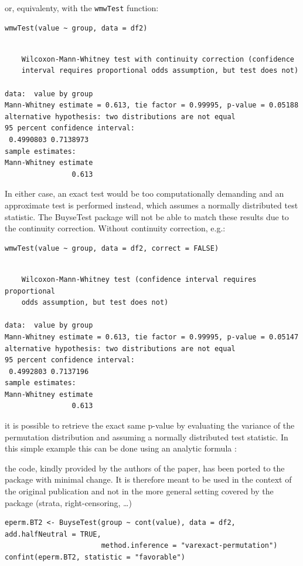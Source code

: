 \documentclass[12pt]{article}
\newcommand\Warning[1][3ex]{%
\renewcommand\stacktype{L}%
\scaleto{\stackon[1.3pt]{\color{red}$\triangle$}{\tiny\bfseries !}}{#1}%
\xspace
}
\begin{document}
or, equivalenty, with the \texttt{wmwTest} function:
\lstset{language=r,label= ,caption= ,captionpos=b,numbers=none}
\begin{lstlisting}
wmwTest(value ~ group, data = df2)
\end{lstlisting}

\begin{verbatim}

	Wilcoxon-Mann-Whitney test with continuity correction (confidence
	interval requires proportional odds assumption, but test does not)

data:  value by group
Mann-Whitney estimate = 0.613, tie factor = 0.99995, p-value = 0.05188
alternative hypothesis: two distributions are not equal
95 percent confidence interval:
 0.4990803 0.7138973
sample estimates:
Mann-Whitney estimate 
                0.613
\end{verbatim}

In either case, an exact test would be too computationally demanding
and an approximate test is performed instead, which assumes a normally
distributed test statistic. The BuyseTest package will not be able to
match these results due to the continuity correction. Without
continuity correction, e.g.:
\lstset{language=r,label= ,caption= ,captionpos=b,numbers=none}
\begin{lstlisting}
wmwTest(value ~ group, data = df2, correct = FALSE)
\end{lstlisting}

\begin{verbatim}

	Wilcoxon-Mann-Whitney test (confidence interval requires proportional
	odds assumption, but test does not)

data:  value by group
Mann-Whitney estimate = 0.613, tie factor = 0.99995, p-value = 0.05147
alternative hypothesis: two distributions are not equal
95 percent confidence interval:
 0.4992803 0.7137196
sample estimates:
Mann-Whitney estimate 
                0.613
\end{verbatim}

\noindent it is possible to retrieve the exact same p-value by
evaluating the variance of the permutation distribution and assuming a
normally distributed test statistic. In this simple example this can
be done using an analytic formula \citep{anderson2023exact}: \newline
\Warning the code, kindly provided by the authors of the paper, has
been ported to the package with minimal change. It is therefore meant
to be used in the context of the original publication and not in the
more general setting covered by the package (strata, right-censoring,
\ldots)
\lstset{language=r,label= ,caption= ,captionpos=b,numbers=none}
\begin{lstlisting}
eperm.BT2 <- BuyseTest(group ~ cont(value), data = df2, add.halfNeutral = TRUE,
                       method.inference = "varexact-permutation")
confint(eperm.BT2, statistic = "favorable")
\end{lstlisting}
\end{document}
